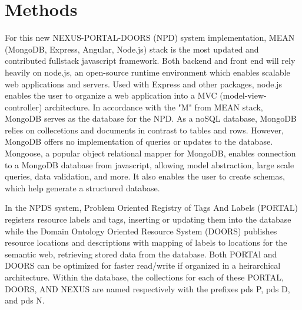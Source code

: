 \documentclass[10pt,twocolumn,twoside]{article}
\begin{document}
\section*{Methods}
\label{secMethods}
	For this new NEXUS-PORTAL-DOORS (NPD) system implementation, MEAN (MongoDB, Express, Angular, Node.js)  stack is the most updated and contributed fullstack javascript framework. Both backend and front end will rely heavily on node.js, an open-source runtime environment which enables scalable web applications and servers. Used with Express and other packages, node.js enables the user to organize a web application into a MVC (model-view-controller) architecture. In accordance with the "M" from MEAN stack, MongoDB serves as the database for the NPD. As a noSQL database, MongoDB relies on collecetions and documents in contrast to tables and rows. However, MongoDB offers no implementation of queries or updates to the database. Mongoose, a popular object relational mapper for MongoDB, enables connection to a MongoDB database from javascript, allowing model abstraction, large scale queries, data validation, and more. It also enables the user to create schemas, which help generate a structured database. \newline
	
	In the NPDS system, Problem Oriented Registry of Tags And Labels (PORTAL) registers resource labels and tags, inserting or updating them into the database while the Domain Ontology Oriented Resource System (DOORS) publishes resource locations and descriptions with mapping of labels to locations for the semantic web, retrieving stored data from the database. Both PORTAl and DOORS can be optimized for faster read/write if organized in a heirarchical architecture. Within the database, the collections for each of these PORTAL, DOORS, AND NEXUS are named respectively with the prefixes pds P, pds D, and pds N. \newline
	
\end{document}
